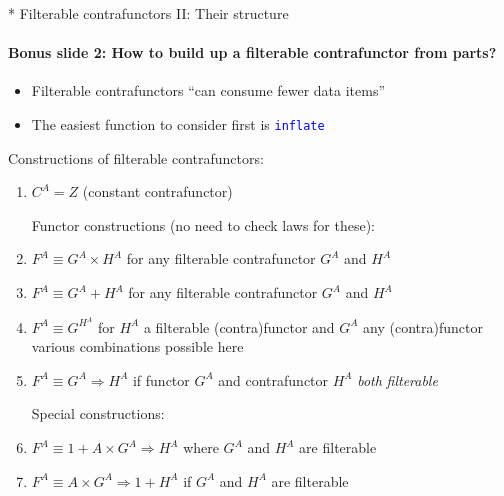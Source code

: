 \documentclass[english]{beamer}
\begin{document}
\begin{frame}{{*} Filterable contrafunctors II: Their structure}

\framesubtitle{Bonus slide 2: How to build up a filterable contrafunctor from parts?}
\begin{itemize}
\item Filterable contrafunctors ``can consume fewer data items''
\item The easiest function to consider first is \texttt{\textcolor{blue}{\footnotesize{}inflate}} 
\end{itemize}
Constructions of filterable contrafunctors:
\begin{enumerate}
\item $C^{A}=Z$ (constant contrafunctor)

Functor constructions (no need to check laws for these): 
\item $F^{A}\equiv G^{A}\times H^{A}$ for any filterable contrafunctor
$G^{A}$ and $H^{A}$
\item $F^{A}\equiv G^{A}+H^{A}$ for any filterable contrafunctor $G^{A}$
and $H^{A}$
\item $F^{A}\equiv G^{H^{A}}$ for $H^{A}$ a filterable (contra)functor
and $G^{A}$ any (contra)functor \textendash{} various combinations
possible here
\item $F^{A}\equiv G^{A}\Rightarrow H^{A}$ if\emph{ }functor $G^{A}$ and
contrafunctor $H^{A}$ \emph{both} \emph{filterable}

Special constructions:
\item $F^{A}\equiv1+A\times G^{A}\Rightarrow H^{A}$ where $G^{A}$ and
$H^{A}$ are filterable
\item $F^{A}\equiv A\times G^{A}\Rightarrow1+H^{A}$ if $G^{A}$ and $H^{A}$
are filterable
\end{enumerate}
\end{frame}
\end{document}
